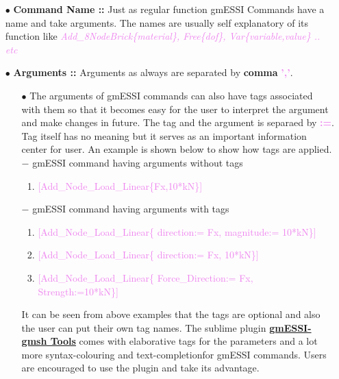 \documentclass[11pt]{article}
\begin{document}
\begin{itemize}

  \item[$\bullet$] \textbf{Command Name :: } Just as regular function gmESSI
  Commands have a name and take arguments. The names are usually self
  explanatory of its function like
  \textcolor{violet}{\textit{Add\_8NodeBrick\{material\}, Free\{dof\},
  Var\{variable,value\} .. etc}}

  \item[$\bullet$] \textbf{Arguments :: } Arguments as always are separated by
  \textbf{comma} \textcolor{violet}{\textbf{','}}.  

  \begin{itemize}

    \item[$\bullet$]  The arguments of gmESSI commands can also have tags associated 
    with them so that it becomes easy for the user to interpret the argument and 
    make changes in future. The tag and the argument is separaed by \textcolor{violet}
    {\textbf{:=}}. Tag itself has no meaning but it serves as an important information 
    center for user. An example is shown below to show how tags are applied.\\

    $-$ gmESSI command having arguments without tags
    \begin{enumerate}
       \item  \textcolor{violet}{[Add\_Node\_Load\_Linear\{Fx,10*kN\}]}    
    \end{enumerate}

    $-$ gmESSI command having arguments with tags
    \begin{enumerate}
       \item  \textcolor{violet}{[Add\_Node\_Load\_Linear\{ direction:= Fx, magnitude:= 10*kN\}]}    
       \item  \textcolor{violet}{[Add\_Node\_Load\_Linear\{ direction:= Fx, 10*kN\}]}      
       \item  \textcolor{violet}{[Add\_Node\_Load\_Linear\{ Force_Direction:= Fx, Strength:=10*kN\}]}
    \end{enumerate}

   
   It can be seen from above examples that the tags are optional and also the user 
   can put their own tag names. The sublime plugin 
   \href{https://packagecontrol.io/packages/gmESSI-gmsh%20tools}
   {\textbf{gmESSI-gmsh Tools}} comes
   with elaborative tags for the parameters and a lot more syntax-colouring and 
   text-completionfor gmESSI commands. Users are encouraged to use the plugin 
   and take its advantage. \\


\end{itemize}
\end{itemize}
\end{document}
